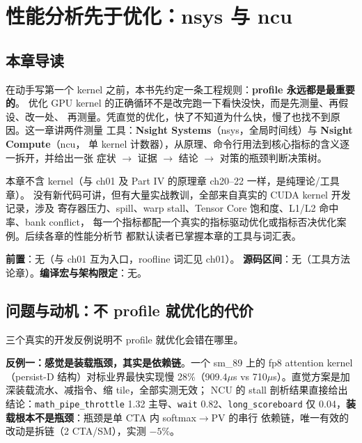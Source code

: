 \chapter{性能分析先于优化：nsys 与 ncu}\label{ch:00}

\section{本章导读}

在动手写第一个 kernel 之前，本书先约定一条工程规则：\textbf{profile 永远都是最重要的}。
优化 GPU kernel 的正确循环不是改完跑一下看快没快，而是先测量、再假设、改一处、
再测量。凭直觉的优化，快了不知道为什么快，慢了也找不到原因。这一章讲两件测量
工具：\textbf{Nsight Systems}（nsys，全局时间线）与 \textbf{Nsight Compute}（ncu，
单 kernel 计数器），从原理、命令行用法到核心指标的含义逐一拆开，并给出一张
症状 $\to$ 证据 $\to$ 结论 $\to$ 对策的瓶颈判断决策树。

本章不含 kernel（与 ch01 及 Part IV 的原理章 ch20--22 一样，是纯理论/工具章）。
没有新代码可讲，但有大量实战教训，全部来自真实的 CUDA kernel 开发记录，涉及
寄存器压力、spill、warp stall、Tensor Core 饱和度、L1/L2 命中率、bank conflict，
每一个指标都配一个真实的指标驱动优化或指标否决优化案例。后续各章的性能分析节
都默认读者已掌握本章的工具与词汇表。

\textbf{前置}：无（与 ch01 互为入口，roofline 词汇见 ch01）。
\textbf{源码区间}：无（工具方法论章）。\textbf{编译宏与架构限定}：无。

\section{问题与动机：不 profile 就优化的代价}

三个真实的开发反例说明不 profile 就优化会错在哪里。

\textbf{反例一：感觉是装载瓶颈，其实是依赖链}。一个 sm\_89 上的 fp8
attention kernel（persist-D 结构）对标业界最快实现慢 28\%（909.4$\mu$s vs
710$\mu$s）。直觉方案是加深装载流水、减指令、缩 tile，全部实测无效；
NCU 的 stall 剖析结果直接给出结论：\texttt{math\_\allowbreak{}pipe\_\allowbreak{}throttle} 1.32
主导、\texttt{wait} 0.82、\texttt{long\_\allowbreak{}scoreboard} 仅
0.04，\textbf{装载根本不是瓶颈}：瓶颈是单 CTA 内 softmax$\to$PV 的串行
依赖链，唯一有效的改动是拆链（2 CTA/SM），实测 $-5\%$。

